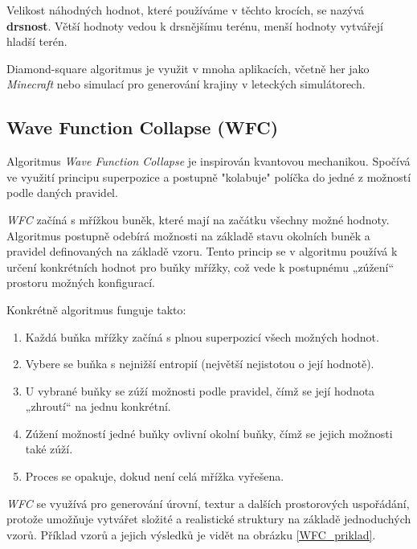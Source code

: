 Velikost náhodných hodnot, které používáme v těchto krocích, se nazývá \textbf{drsnost}. Větší hodnoty vedou k drsnějšímu terénu, menší hodnoty vytvářejí hladší terén.

Diamond-square algoritmus je využit v mnoha aplikacích, včetně her jako \textit{Minecraft} nebo simulací pro generování krajiny v leteckých simulátorech.

\subsection{Wave Function Collapse (WFC)}

Algoritmus \textit{Wave Function Collapse} je inspirován kvantovou mechanikou. Spočívá ve využití principu superpozice a postupně "kolabuje" políčka do jedné z možností podle daných pravidel. 

\textit{WFC} začíná s mřížkou buněk, které mají na začátku všechny možné hodnoty. Algoritmus postupně odebírá možnosti na základě stavu okolních buněk a pravidel definovaných na základě vzoru. Tento princip se v algoritmu používá k určení konkrétních hodnot pro buňky mřížky, což vede k postupnému „zúžení“ prostoru možných konfigurací.

Konkrétně algoritmus funguje takto:
\begin{enumerate}
    \item Každá buňka mřížky začíná s plnou superpozicí všech možných hodnot.
    \item Vybere se buňka s nejnižší entropií (největší nejistotou o její hodnotě).
    \item U vybrané buňky se zúží možnosti podle pravidel, čímž se její hodnota „zhroutí“ na jednu konkrétní.
    \item Zúžení možností jedné buňky ovlivní okolní buňky, čímž se jejich možnosti také zúží.
    \item Proces se opakuje, dokud není celá mřížka vyřešena.
\end{enumerate}

\textit{WFC} se využívá pro generování úrovní, textur a dalších prostorových uspořádání, protože umožňuje vytvářet složité a realistické struktury na základě jednoduchých vzorů. Příklad vzorů a jejich výsledků je vidět na obrázku \vref{WFC_priklad}. \cite{waveClanek}

